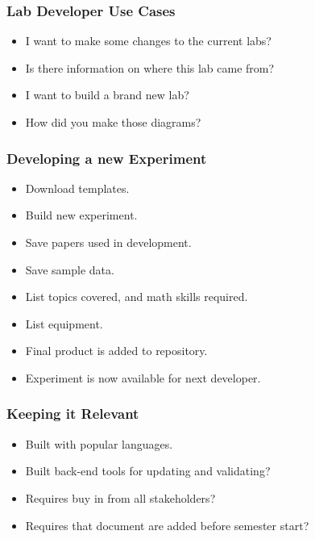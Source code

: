 \documentclass{beamer}
\begin{document}
  \begin{frame}
    \frametitle{Lab Developer Use Cases}
    \begin{itemize}
    		\item I want to make some changes to the current labs?
    		\item Is there information on where this lab came from?
	    \item I want to build a brand new lab?
    		\item How did you make those diagrams?
    \end{itemize}
  \end{frame}

  \begin{frame}
    \frametitle{Developing a new Experiment}
    \begin{itemize}
    		\item Download templates.
    		\item Build new experiment.
    		\item Save papers used in development.
    		\item Save sample data.
    		\item List topics covered, and math skills required.
    		\item List equipment.
    		\item Final product is added to repository.
    		\item Experiment is now available for next developer.
    \end{itemize}
  \end{frame}


  \begin{frame}
    \frametitle{Keeping it Relevant}
    \begin{itemize}
    		\item Built with popular languages.
    		\item Built back-end tools for updating and validating?
    		\item Requires buy in from all stakeholders?
    		\item Requires that document are added before semester start?
    \end{itemize}
  \end{frame}
\end{document}
